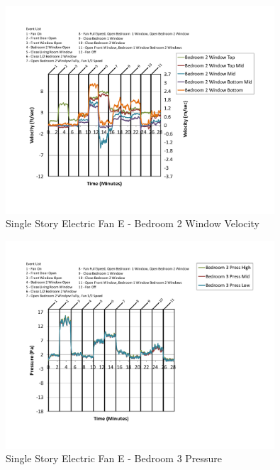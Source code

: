 \documentclass{article}
\begin{document}
\begin{appendices}
	\begin{figure}[H]
		\centering
		\includegraphics[height=3.05in,trim=0.67in 1.1in 0.67in 0.8in,clip=true]{0_Images/Results_Charts/ColdFlow/Single_Story/Electric/E/Bedroom_2_Window_Velocity.pdf}
		\caption{Single Story Electric Fan E - Bedroom 2 Window Velocity}
	\end{figure}
 

	\begin{figure}[H]
		\centering
		\includegraphics[height=3.05in,trim=0.67in 1.1in 0.67in 0.8in,clip=true]{0_Images/Results_Charts/ColdFlow/Single_Story/Electric/E/Bedroom_3_Pressure.pdf}
		\caption{Single Story Electric Fan E - Bedroom 3 Pressure}
	\end{figure}
 
	\clearpage


\end{appendices}
\end{document}
